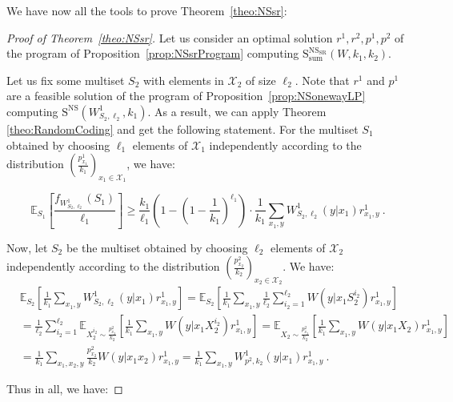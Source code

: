 \documentclass[11pt]{article}
\theoremstyle{definition}
\theoremstyle{remark}
\begin{document}
We have now all the tools to prove Theorem~\ref{theo:NSsr}:

\begin{proof}[Proof of Theorem~\ref{theo:NSsr}]
  Let us consider an optimal solution $r^1,r^2,p^1,p^2$ of the program of Proposition~\ref{prop:NSsrProgram} computing $\mathrm{S}_{\text{sum}}^{\mathrm{NS}_{\mathrm{SR}}}(W,k_1,k_2)$.

  Let us fix some multiset $S_2$ with elements in $\mathcal{X}_2$ of size $\ell_2$. Note that $r^1$ and $p^1$ are a feasible solution of the program of Proposition~\ref{prop:NSonewayLP} computing $\mathrm{S}^{\mathrm{NS}}(W^1_{S_2,\ell_2},k_1)$. As a result, we can apply Theorem \ref{theo:RandomCoding} and get the following statement. For the multiset $S_1$ obtained by choosing $\ell_1$ elements of $\mathcal{X}_1$ independently according to the distribution $\left(\frac{p^1_{x_1}}{k_1}\right)_{x_1 \in \mathcal{X}_1}$, we have:

  \[ \mathbb{E}_{S_1}\left[ \frac{f_{W^1_{S_2,\ell_2}}(S_1)}{\ell_1}\right] \geq \frac{k_1}{\ell_1}\left(1-\left(1-\frac{1}{k_1}\right)^{\ell_1}\right) \cdot \frac{1}{k_1}\sum_{x_1,y} W^1_{S_2,\ell_2}(y|x_1)r^1_{x_1,y} \ .\]

  Now, let $S_2$ be the multiset obtained by choosing $\ell_2$ elements of $\mathcal{X}_2$ independently according to the distribution $\left(\frac{p^2_{x_2}}{k_2}\right)_{x_2 \in \mathcal{X}_2}$. We have:
  \begin{equation}
    \begin{aligned}
      &\mathbb{E}_{S_2}\left[\frac{1}{k_1}\sum_{x_1,y}W^1_{S_2,\ell_2}(y|x_1)r^1_{x_1,y}\right] = \mathbb{E}_{S_2}\left[\frac{1}{k_1}\sum_{x_1,y}\frac{1}{\ell_2}\sum_{i_2=1}^{\ell_2}W(y|x_1S_2^{i_2})r^1_{x_1,y}\right]\\
      &= \frac{1}{\ell_2}\sum_{i_2=1}^{\ell_2}\mathbb{E}_{X^{i_2}_2 \sim \frac{p^2_{x_2}}{k_2}}\left[\frac{1}{k_1}\sum_{x_1,y}W(y|x_1X^{i_2}_2)r^1_{x_1,y}\right] = \mathbb{E}_{X_2 \sim \frac{p^2_{x_2}}{k_2}}\left[\frac{1}{k_1}\sum_{x_1,y}W(y|x_1X_2)r^1_{x_1,y}\right]\\
      &= \frac{1}{k_1}\sum_{x_1,x_2,y}\frac{p^2_{x_2}}{k_2}W(y|x_1x_2)r^1_{x_1,y} = \frac{1}{k_1}\sum_{x_1,y}W^1_{p^2,k_2}(y|x_1)r^1_{x_1,y} \ .
    \end{aligned}
  \end{equation}

  Thus in all, we have:


\end{proof}
\end{document}
